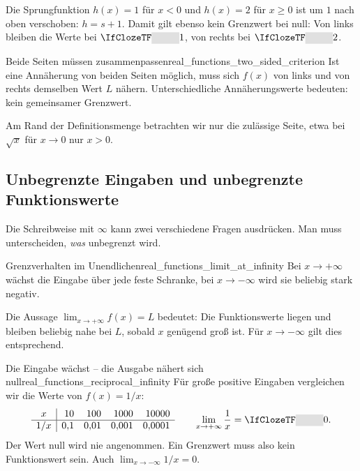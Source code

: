 Die Sprungfunktion $h(x)=1$ für $x<0$ und $h(x)=2$ für $x\ge0$
ist um $1$ nach oben verschoben: $h=s+1$. Damit gilt ebenso
kein Grenzwert bei null: Von links bleiben die Werte bei
$\Cloze{1cm}{1}$, von rechts bei $\Cloze{1cm}{2}$.
\begin{KeyPointBox}{Beide Seiten müssen zusammenpassen}{real_functions_two_sided_criterion}
  Ist eine Annäherung von beiden Seiten möglich, muss sich $f(x)$
  von links und von rechts demselben Wert $L$ nähern.
  Unterschiedliche Annäherungswerte bedeuten: kein gemeinsamer Grenzwert.
  \par\smallskip
  Am Rand der Definitionsmenge betrachten wir nur die zulässige Seite,
  etwa bei $\sqrt{x}$ für $x\to0$ nur $x>0$.
\end{KeyPointBox}

\subsection{Unbegrenzte Eingaben und unbegrenzte Funktionswerte}
\label{subsec:real_functions_infinite_limits}
Die Schreibweise mit $\infty$ kann zwei verschiedene Fragen ausdrücken.
Man muss unterscheiden, \emph{was} unbegrenzt wird.
\par\noindent\begin{minipage}{\linewidth}
\begin{DefinitionBox}{Grenzverhalten im Unendlichen}{real_functions_limit_at_infinity}
  Bei $x\to+\infty$ wächst die Eingabe über jede feste Schranke,
  bei $x\to-\infty$ wird sie beliebig stark negativ.

  Die Aussage $\lim_{x\to+\infty}f(x)=L$ bedeutet:
  Die Funktionswerte liegen und bleiben beliebig nahe bei $L$,
  sobald $x$ genügend groß ist. Für $x\to-\infty$ gilt dies entsprechend.
\end{DefinitionBox}
\begin{ExampleBox}[before skip=0.3\baselineskip]{Die Eingabe wächst -- die Ausgabe nähert sich null}{real_functions_reciprocal_infinity}
  Für große positive Eingaben vergleichen wir die Werte von $f(x)=1/x$:
  \[
    \begin{array}{c|rrrr}
      x&10&100&1000&10000\\ \hline
      1/x&0{,}1&0{,}01&0{,}001&0{,}0001
    \end{array}
    \qquad
    \lim_{x\to+\infty}\frac1x=\Cloze{1cm}{0}.
  \]
  Der Wert null wird nie angenommen. Ein Grenzwert muss also kein
  Funktionswert sein. Auch $\lim_{x\to-\infty}1/x=0$.
\end{ExampleBox}
\end{minipage}


